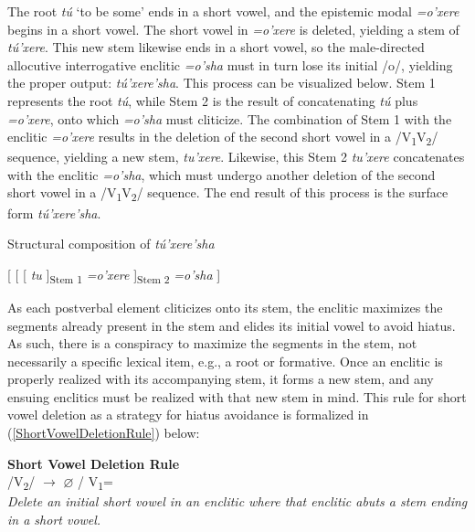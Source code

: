 The root \textit{tú} `to be some' ends in a short vowel, and the epistemic modal \textit{=o'xere} begins in a short vowel. The short vowel in \textit{=o'xere} is deleted, yielding a stem of \textit{tú'xere}. This new stem likewise ends in a short vowel, so the male-directed allocutive interrogative enclitic \textit{=o'sha} must in turn lose its initial /o/, yielding the proper output: \textit{tú'xere'sha}. This process can be visualized below. Stem 1 represents the root \textit{tú}, while Stem 2 is the result of concatenating \textit{tú} plus \textit{=o'xere}, onto which \textit{=o'sha} must cliticize. The combination of Stem 1 with the enclitic \textit{=o'xere} results in the deletion of the second short vowel in a /V\textsubscript{1}V\textsubscript{2}/ sequence, yielding a new stem, \textit{tu'xere}. Likewise, this Stem 2 \textit{tu'xere} concatenates with the enclitic \textit{=o'sha}, which must undergo another deletion of the second short vowel in a /V\textsubscript{1}V\textsubscript{2}/ sequence. The end result of this process is the surface form \textit{tú'xere'sha}.

\begin{exe}

\item\label{structureofTuPxerePsha} Structural composition of \textit{tú'xere'sha}

[ [ [ \textit{tu} ]\textsubscript{Stem 1} \textit{=o'xere} ]\textsubscript{Stem 2} \textit{=o'sha} ]

\end{exe}

As each postverbal element cliticizes onto its stem, the enclitic maximizes the segments already present in the stem and elides its initial vowel to avoid hiatus. As such, there is a conspiracy to maximize the segments in the stem, not necessarily a specific lexical item, e.g., a root or formative. Once an enclitic is properly realized with its accompanying stem, it forms a new stem, and any ensuing enclitics must be realized with that new stem in mind. This rule for short vowel deletion as a strategy for hiatus avoidance is formalized in (\ref{ShortVowelDeletionRule}) below:

\begin{exe}

\item\label{ShortVowelDeletionRule} \textbf{Short Vowel Deletion Rule}\\
	/V\textsubscript{2}/ $\to$ $\varnothing$ / V\textsubscript{1}={\longrule}\\
	\textit{Delete an initial short vowel in an enclitic where that enclitic abuts a stem ending in a short vowel.}

\end{exe}

